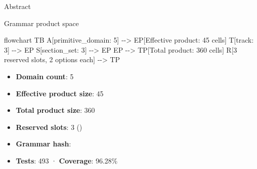 \documentclass[
  ignorenonframetext,
]{beamer}
\newenvironment{Shaded}{}{}
\newcommand{\NormalTok}[1]{#1}
\providecommand{\tightlist}{%
  \setlength{\itemsep}{0pt}\setlength{\parskip}{0pt}}
\begin{document}
\begin{frame}{Abstract}
\begin{block}{Grammar product space}
\protect{}\label{grammar-product-space}
\begin{Shaded}
\begin{Highlighting}[]
\NormalTok{flowchart TB}
\NormalTok{    A[primitive\_domain: 5] {-}{-}\textgreater{} EP[Effective product: 45 cells]}
\NormalTok{    T[track: 3] {-}{-}\textgreater{} EP}
\NormalTok{    S[section\_set: 3] {-}{-}\textgreater{} EP}
\NormalTok{    EP {-}{-}\textgreater{} TP[Total product: 360 cells]}
\NormalTok{    R[3 reserved slots, 2 options each] {-}{-}\textgreater{} TP}
\end{Highlighting}
\end{Shaded}

\begin{itemize}
\tightlist
\item
  \textbf{Domain count}: 5
\item
  \textbf{Effective product size}: 45
\item
  \textbf{Total product size}: 360
\item
  \textbf{Reserved slots}: 3
  ()
\item
  \textbf{Grammar hash}: 
\item
  \textbf{Tests}: 493 · \textbf{Coverage}: 96.28\%
\end{itemize}
\end{block}
\end{frame}
\end{document}
